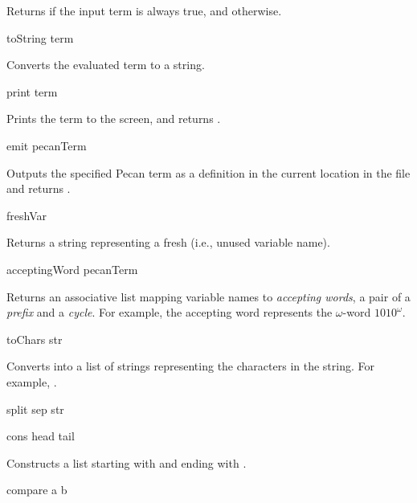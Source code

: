 Returns  if the input term is always true, and  otherwise.

\begin{pecan}
toString term
\end{pecan}

Converts the evaluated term to a string.

\begin{pecan}
print term
\end{pecan}

Prints the term to the screen, and returns .

\begin{pecan}
emit pecanTerm
\end{pecan}

Outputs the specified Pecan term as a definition in the current location in the file and returns .

\begin{pecan}
freshVar
\end{pecan}

Returns a string representing a fresh (i.e., unused variable name).

\begin{pecan}
acceptingWord pecanTerm
\end{pecan}

Returns an associative list mapping variable names to \emph{accepting words}, a pair of a \emph{prefix} and a \emph{cycle}.
For example, the accepting word  represents the $\omega$-word $1010^\omega$.

\begin{pecan}
toChars str
\end{pecan}

Converts  into a list of strings representing the characters in the string.
For example, .

\begin{pecan}
split sep str
\end{pecan}

\begin{pecan}
cons head tail
\end{pecan}

Constructs a list starting with  and ending with .

\begin{pecan}
compare a b
\end{pecan}

